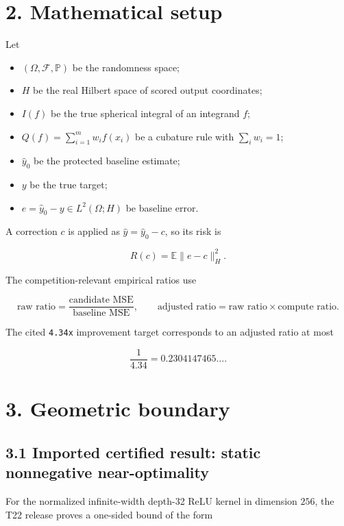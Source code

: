 \documentclass[
  10pt,
]{article}
\providecommand{\tightlist}{%
  \setlength{\itemsep}{0pt}\setlength{\parskip}{0pt}}
\begin{document}
\section{2. Mathematical setup}\label{mathematical-setup}

Let

\begin{itemize}
\tightlist
\item
  \((\Omega,\mathcal F,\mathbb P)\) be the randomness space;
\item
  \(H\) be the real Hilbert space of scored output coordinates;
\item
  \(I(f)\) be the true spherical integral of an integrand \(f\);
\item
  \(Q(f)=\sum_{i=1}^m w_i f(x_i)\) be a cubature rule with
  \(\sum_i w_i=1\);
\item
  \(\widehat y_0\) be the protected baseline estimate;
\item
  \(y\) be the true target;
\item
  \(e=\widehat y_0-y\in L^2(\Omega;H)\) be baseline error.
\end{itemize}

A correction \(c\) is applied as \(\widehat y=\widehat y_0-c\), so its
risk is

\[
R(c)=\mathbb E\|e-c\|_H^2.
\]

The competition-relevant empirical ratios use

\[
\text{raw ratio}=\frac{\text{candidate MSE}}{\text{baseline MSE}},
\qquad
\text{adjusted ratio}=\text{raw ratio}\times\text{compute ratio}.
\]

The cited \texttt{4.34x} improvement target corresponds to an adjusted
ratio at most

\[
\frac1{4.34}=0.2304147465\ldots.
\]

\section{3. Geometric boundary}\label{geometric-boundary}

\subsection{3.1 Imported certified result: static nonnegative
near-optimality}\label{imported-certified-result-static-nonnegative-near-optimality}

For the normalized infinite-width depth-32 ReLU kernel in dimension
\(256\), the T22 release proves a one-sided bound of the form
\end{document}
